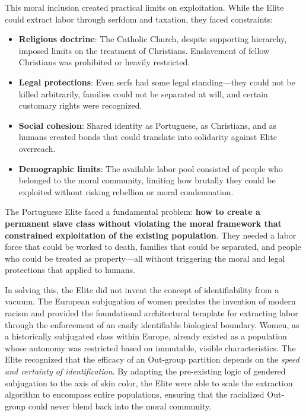 \documentclass[12pt,openany]{book}
\begin{document}
This moral inclusion created practical limits on exploitation. While the Elite could extract labor through serfdom and taxation, they faced constraints:
\begin{itemize}
    \item \textbf{Religious doctrine}: The Catholic Church, despite supporting hierarchy, imposed limits on the treatment of Christians. Enslavement of fellow Christians was prohibited or heavily restricted.
    \item \textbf{Legal protections}: Even serfs had some legal standing---they could not be killed arbitrarily, families could not be separated at will, and certain customary rights were recognized.
    \item \textbf{Social cohesion}: Shared identity as Portuguese, as Christians, and as humans created bonds that could translate into solidarity against Elite overreach.
    \item \textbf{Demographic limits}: The available labor pool consisted of people who belonged to the moral community, limiting how brutally they could be exploited without risking rebellion or moral condemnation.
\end{itemize}

The Portuguese Elite faced a fundamental problem: \textbf{how to create a permanent slave class without violating the moral framework that constrained exploitation of the existing population}. They needed a labor force that could be worked to death, families that could be separated, and people who could be treated as property---all without triggering the moral and legal protections that applied to humans.

In solving this, the Elite did not invent the concept of identifiability from a vacuum. The European subjugation of women predates the invention of modern racism and provided the foundational architectural template for extracting labor through the enforcement of an easily identifiable biological boundary. Women, as a historically subjugated class within Europe, already existed as a population whose autonomy was restricted based on immutable, visible characteristics. The Elite recognized that the efficacy of an Out-group partition depends on the \textit{speed and certainty of identification}. By adapting the pre-existing logic of gendered subjugation to the axis of skin color, the Elite were able to scale the extraction algorithm to encompass entire populations, ensuring that the racialized Out-group could never blend back into the moral community.
\end{document}
